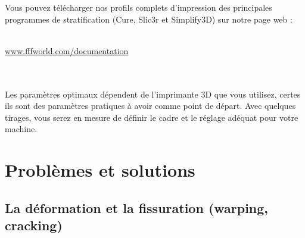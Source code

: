 \documentclass[11pt,a4paper]{article}
\begin{document}
Vous pouvez télécharger nos profils complets d’impression des principales programmes de stratification (Cure, Slic3r et Simplify3D) sur notre page web :
\\\\
\centerline{ {\huge \url{www.fffworld.com/documentation} } }
\\\\
Les paramètres optimaux dépendent de l’imprimante 3D que vous utilisez, certes ils sont des paramètres pratiques à avoir comme point de départ. Avec quelques tirages, vous serez en mesure de définir  le cadre et le réglage adéquat pour votre machine.
\section{Problèmes et solutions}
\subsection{La déformation et la fissuration (warping, cracking)}
\end{document}
